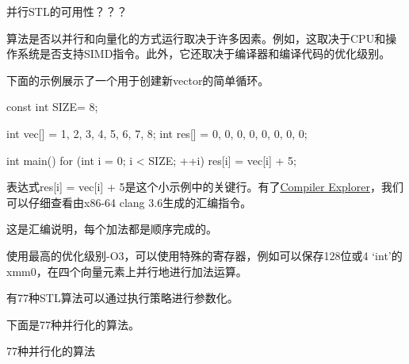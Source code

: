 \begin{myTip}{并行STL的可用性？？？}
	
算法是否以并行和向量化的方式运行取决于许多因素。例如，这取决于CPU和操作系统是否支持SIMD指令。此外，它还取决于编译器和编译代码的优化级别。

下面的示例展示了一个用于创建新vector的简单循环。

\begin{cpp}
const int SIZE= 8;

int vec[] = {1, 2, 3, 4, 5, 6, 7, 8};
int res[] = {0, 0, 0, 0, 0, 0, 0, 0};

int main(){
	for (int i = 0; i < SIZE; ++i) {
		res[i] = vec[i] + 5;
	}
}
\end{cpp}

表达式res[i] = vec[i] + 5是这个小示例中的关键行。有了\href{https://godbolt.org/}{Compiler Explorer}，我们可以仔细查看由x86-64 clang 3.6生成的汇编指令。


这是汇编说明，每个加法都是顺序完成的。




使用最高的优化级别-O3，可以使用特殊的寄存器，例如可以保存128位或4 ‘int’的xmm0，在四个向量元素上并行地进行加法运算。


\end{myTip}

有77种STL算法可以通过执行策略进行参数化。


下面是77种并行化的算法。

\begin{center}
77种并行化的算法
\end{center}

